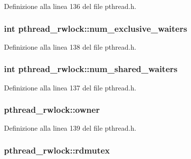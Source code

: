 Definizione alla linea 136 del file pthread.\+h.

\hypertarget{structpthread__rwlock_a5d8b56e7998376aa9f5908a560daadb7}{
\subsubsection[{num\+\_\+exclusive\+\_\+waiters}]{\setlength{\rightskip}{0pt plus 5cm}int pthread\+\_\+rwlock\+::num\+\_\+exclusive\+\_\+waiters}}\label{structpthread__rwlock_a5d8b56e7998376aa9f5908a560daadb7}


Definizione alla linea 138 del file pthread.\+h.

\hypertarget{structpthread__rwlock_af637581bd0ea0328763d041937160fff}{
\subsubsection[{num\+\_\+shared\+\_\+waiters}]{\setlength{\rightskip}{0pt plus 5cm}int pthread\+\_\+rwlock\+::num\+\_\+shared\+\_\+waiters}}\label{structpthread__rwlock_af637581bd0ea0328763d041937160fff}


Definizione alla linea 137 del file pthread.\+h.

\hypertarget{structpthread__rwlock_a7918a35d8e929df9c7f1fd9f12e9efcf}{
\subsubsection[{owner}]{ pthread\+\_\+rwlock\+::owner}}\label{structpthread__rwlock_a7918a35d8e929df9c7f1fd9f12e9efcf}


Definizione alla linea 139 del file pthread.\+h.

\hypertarget{structpthread__rwlock_aa525fa5ae59171418ede7d1894bf21fe}{
\subsubsection[{rdmutex}]{ pthread\+\_\+rwlock\+::rdmutex}}\label{structpthread__rwlock_aa525fa5ae59171418ede7d1894bf21fe}


